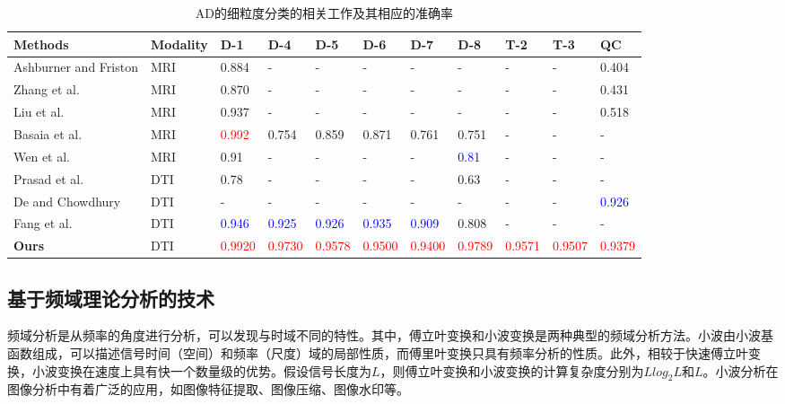 \begin{table}[ht]
\centering
\caption{AD的细粒度分类的相关工作及其相应的准确率}\label{paper3fine_classify}
\footnotesize
\begin{tabular}{p{1.8cm}<{\centering}p{1.0cm}<{\centering}p{0.75cm}<{\centering}p{0.75cm}<{\centering}p{0.75cm}<{\centering}p{0.75cm}<{\centering}p{0.75cm}<{\centering}p{0.75cm}<{\centering}p{0.75cm}<{\centering}p{0.75cm}<{\centering}p{0.75cm}<{\centering}}
\hline
Methods &Modality & D-1 & D-4   & D-5 & D-6    & D-7   & D-8   & T-2    & T-3   & QC     \\ \hline
Ashburner and Friston \cite{ashburner2000voxel} &MRI &0.884 & - & - & - & - & - & - & - &0.404\\
Zhang et al. \cite{zhang2016detecting} &MRI &0.870 & - & - & - & -  & - & - & - &0.431 \\
Liu et al. \cite{liu2018joint} &MRI &0.937 & - & -  & - & - & -  & - & - &0.518  \\
Basaia et al. \cite{2018Automated} &MRI &\textcolor{red}{{0.992}} & 0.754 & 0.859 & 0.871 & 0.761 & 0.751 & - & - & - \\
Wen et al. \cite{2020Convolutional} &MRI &0.91 & - & - & - & -
& \textcolor{blue}{{0.81}} & -  & -   & -   \\
\hline
Prasad et al. \cite{prasad2015brain} &DTI &0.78 & -  & -  & - & -               & 0.63  & -  & -   & - \\
De and Chowdhury \cite{de2021dti}  &DTI  & - & -   & -  & - & - & -  & -  & -   &\textcolor{blue}{{0.926}} \\
Fang et al. \cite{Fangmeie2022}  &DTI & \textcolor{blue}{{0.946 }}            & \textcolor{blue}{{0.925 }}
& \textcolor{blue}{{0.926 }}
& \textcolor{blue}{{0.935 }}
& \textcolor{blue}{{0.909}}
& 0.808  & -  & -   & -  \\
\textbf{Ours} &DTI & \textcolor{red}{{0.9920}}    & \textcolor{red}{{0.9730}}  & \textcolor{red}{{0.9578}}   & \textcolor{red}{{0.9500}}  & \textcolor{red}{{0.9400}}  & \textcolor{red}{{0.9789}} &
\textcolor{red}{{0.9571}} & \textcolor{red}{{0.9507}} & \textcolor{red}{{0.9379}} \\

 \hline
\end{tabular}
\end{table}

\subsection{基于频域理论分析的技术} 
频域分析是从频率的角度进行分析，可以发现与时域不同的特性。其中，傅立叶变换和小波变换是两种典型的频域分析方法。小波由小波基函数组成，可以描述信号时间（空间）和频率（尺度）域的局部性质，而傅里叶变换只具有频率分析的性质。此外，相较于快速傅立叶变换，小波变换在速度上具有快一个数量级的优势。假设信号长度为$L$，则傅立叶变换和小波变换的计算复杂度分别为$Llog_{2}L$和$L$。小波分析在图像分析中有着广泛的应用，如图像特征提取、图像压缩、图像水印等。

